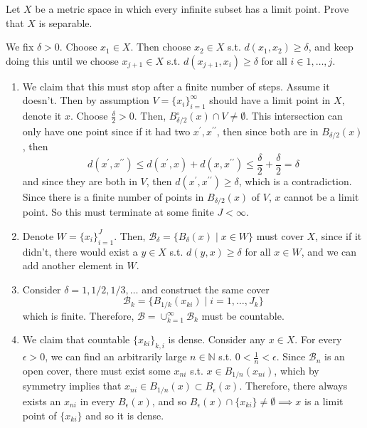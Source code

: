 \documentclass{article}
\begin{document}
    \begin{exercise}[Rudin 2.24]
    Let $X$ be a metric space in which every infinite subset has a limit point. Prove that $X$ is separable. 
    \end{exercise}
    \begin{solution}
    We fix $\delta > 0$. Choose $x_1 \in X$. Then choose $x_2 \in X$ s.t. $d(x_1, x_2) \geq \delta$, and keep doing this until we choose $x_{j + 1} \in X$ s.t. $d(x_{j+1}, x_i) \geq \delta$ for all $i \in 1, \ldots, j$. 
    \begin{enumerate}
        \item We claim that this must stop after a finite number of steps. Assume it doesn't. Then by assumption $V = \{x_i\}_{i=1}^\infty$ should have a limit point in $X$, denote it $x$. Choose $\frac{\delta}{2} > 0$. Then, $B_{\delta / 2}^\circ (x) \cap V \neq \emptyset$. This intersection can only have one point since if it had two $x^\prime, x^{\prime\prime}$, then since both are in $B_{\delta /2} (x)$, then 
        \[d(x^\prime, x^{\prime\prime}) \leq d(x^\prime, x) + d(x, x^{\prime\prime}) \leq \frac{\delta}{2} + \frac{\delta}{2} = \delta\]
        and since they are both in $V$, then $d(x^\prime, x^{\prime\prime}) \geq \delta$, which is a contradiction. Since there is a finite number of points in $B_{\delta /2} (x)$ of $V$, $x$ cannot be a limit point. So this must terminate at some finite $J < \infty$. 
        \item Denote $W = \{x_i\}_{i=1}^J$. Then, $\mathscr{B}_\delta = \{B_\delta (x) \mid x \in W\}$ must cover $X$, since if it didn't, there would exist a $y \in X$ s.t. $d(y, x) \geq \delta$ for all $x \in W$, and we can add another element in $W$. 
        \item Consider $\delta = 1, 1/2, 1/3, \ldots$ and construct the same cover 
        \[\mathscr{B}_k = \{B_{1/k} (x_{ki}) \mid i = 1, \ldots, J_k\}\]
        which is finite. Therefore, $\mathscr{B} = \cup_{k=1}^\infty \mathscr{B}_k$ must be countable. 
        \item We claim that countable $\{x_{ki}\}_{k, i}$ is dense. Consider any $x \in X$. For every $\epsilon > 0$, we can find an arbitrarily large $n \in \mathbb{N}$ s.t. $0 < \frac{1}{n} < \epsilon$. Since $\mathscr{B}_n$ is an open cover, there must exist some $x_{n i}$ s.t. $x \in B_{1/n} (x_{ni})$, which by symmetry implies that $x_{ni} \in B_{1/n} (x) \subset B_\epsilon (x)$. Therefore, there always exists an $x_{ni}$ in every $B_\epsilon (x)$, and so $B_\epsilon (x) \cap \{x_{ki}\} \neq \emptyset \implies x$ is a limit point of $\{x_{ki}\}$ and so it is dense. 
    \end{enumerate}
    \end{solution}
\end{document}
